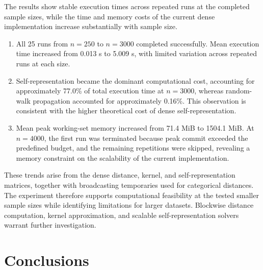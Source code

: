 \documentclass[ASNA,twocolumn]{USG} %
\begin{document}
The results show stable execution times across repeated runs at the completed sample sizes, while the time and memory costs of the current dense implementation increase substantially with sample size.

\begin{enumerate}[\indent (1)]
    \item All 25 runs from $n=250$ to $n=3000$ completed successfully. Mean execution time increased from 0.013 s to 5.009 s, with limited variation across repeated runs at each size.

    \item Self-representation became the dominant computational cost, accounting for approximately 77.0\% of total execution time at $n=3000$, whereas random-walk propagation accounted for approximately 0.16\%. This observation is consistent with the higher theoretical cost of dense self-representation.

    \item Mean peak working-set memory increased from 71.4 MiB to 1504.1 MiB. At $n=4000$, the first run was terminated because peak commit exceeded the predefined budget, and the remaining repetitions were skipped, revealing a memory constraint on the scalability of the current implementation.
\end{enumerate}

These trends arise from the dense distance, kernel, and self-representation matrices, together with broadcasting temporaries used for categorical distances. The experiment therefore supports computational feasibility at the tested smaller sample sizes while identifying limitations for larger datasets. Blockwise distance computation, kernel approximation, and scalable self-representation solvers warrant further investigation.





\section{Conclusions}\label{Conclusions}
\end{document}

